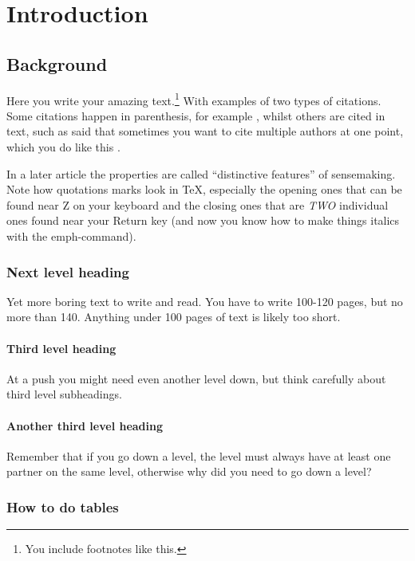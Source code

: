 \chapter{Introduction}
\label{chp:intro}


\section{Background}

Here you write your amazing text.\footnote{You include footnotes like this.} With examples of two types of citations. Some citations happen in parenthesis, for example \parencite[215]{Abma2000} , whilst others are cited in text, such as \textcite[4]{Ancora2012} said that sometimes you want to cite multiple authors at one point, which you do like this \parencite{Czarniawska2000, Weick1995}.

In a later article \parencite[410-413]{Weick2005} the properties are called ``distinctive features'' of sensemaking. 
Note how quotations marks look in TeX, especially the opening ones that can be found near Z on your keyboard and the closing ones that are \emph{TWO} individual ones found near your Return key (and now you know how to make things italics with the emph-command).

\subsection{Next level heading}

Yet more boring text to write and read. You have to write 100-120 pages, but no more than 140. Anything under 100 pages of text is likely too short.

\subsubsection{Third level heading}
At a push you might need even another level down, but think carefully about third level subheadings.

\subsubsection{Another third level heading}
Remember that if you go down a level, the level must always have at least one partner on the same level, otherwise why did you need to go down a level?

\subsection{How to do tables}

